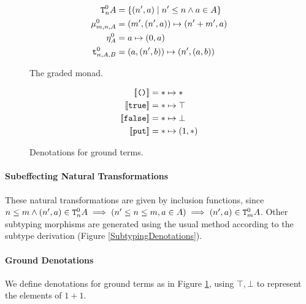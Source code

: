 \begin{figure}
    \centering
    \begin{minipage}[t]{0.45\linewidth}
        \begin{framed}
            \begin{align*}
                \texttt{T}^0_{n}A & = \{(n', a) \mid n'\leq n\wedge a\in A \}\\
                \mu_{m, n, A}^0 & = (m', (n', a))\mapsto (n' + m', a)\\
                \eta_{A}^0 & = a\mapsto (0, a)\\
                \texttt{t}_{n, A, B}^0 & = (a, (n', b)) \mapsto (n', (a, b))
            \end{align*}
        \end{framed}
        \caption{The graded monad.}
        \label{AdequacyGradedMonad}
    \end{minipage}\quad
    \begin{minipage}[t]{0.45\linewidth}
        \begin{framed}
            \begin{align*}
                \deno{\u} & = \singleton\mapsto \singleton\\
                \deno{\t} & = \singleton\mapsto \top\\
                \deno{\f} & = \singleton\mapsto \bot\\
                \deno{\put} & = \singleton\mapsto (1, \singleton)
            \end{align*}
            \end{framed}
            
                \caption{Denotations for ground terms. }
                \label{PECPUTGroundDenotations}
    \end{minipage}
\end{figure}


   


\paragraph{Subeffecting Natural Transformations}
These natural transformations are given by inclusion functions, since $n\leq m\wedge (n',a)\in\texttt{T}^0_{n}A \implies (n'\leq n \leq m, a\in A)\implies (n',a)\in\texttt{T}^0_{m}A$. Other subtyping morphisms are generated using the usual method according to the subtype derivation (Figure \ref{SubtypingDenotations}).

\paragraph{Ground Denotations}
We define denotations for ground terms as in Figure \ref{PECPUTGroundDenotations}, using $\top, \bot$ to represent the elements of $1+1$.






